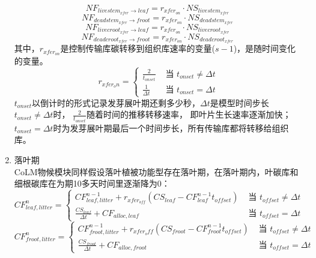 \begin{enumerate}
\begin{equation}
  NF_{livestem_{xfer}\rightarrow leaf}=r_{{xfer}_{on}}\cdot NS_{livestem_{xfer}}\ 
\end{equation}
\begin{equation}
  NF_{deadstem_{xfer}\rightarrow froot}=r_{{xfer}_{on}}\cdot NS_{deadstem_{xfer}}\ 
\end{equation}
\begin{equation}
  NF_{livecroot_{xfer}\rightarrow leaf}=r_{{xfer}_{on}}\cdot NS_{livecroot_{xfer}}\ 
\end{equation}
\begin{equation}
  NF_{deadcroot_{xfer}\rightarrow froot}=r_{{xfer}_{on}}\cdot NS_{deadcroot_{xfer}}\ 
\end{equation}
其中，$r_{{xfer}_{on}}$是控制传输库碳转移到组织库速率的变量($s-1$)，是随时间变化的变量。
\begin{equation}
r_{xfer_{o} n}=\left\{\begin{array}{ll}\frac{2}{t_{ {onset}}} &  \text{ 当 }  t_{ {onset}} \neq \Delta t \\ \frac{1}{\Delta t} &  \text{ 当 }  t_{onset}=\Delta t\end{array}\right.
\end{equation}
$t_{onset}$以倒计时的形式记录发芽展叶期还剩多少秒，$\Delta t$是模型时间步长$t_{onset}\neq\Delta t$时，
$\frac{2}{t_{onset}}$随着时间的推移转移速率，
即叶片生长速率逐渐加快；$t_{onset}=\Delta t$时为发芽展叶期最后一个时间步长，所有传输库都将转移给组织库。\\
\item 落叶期 \\
CoLM物候模块同样假设落叶植被功能型存在落叶期，在落叶期内，叶碳库和细根碳库在为期10多天时间里逐渐降为0：
\begin{equation}
CF_{ {leaf,litter }}^{n}=\left\{\begin{array}{ll}CF_{ {leaf,litter }}^{n-1}+r_{xfer_{off}}\left(CS_{ {leaf }}-CF_{ {leaf }}^{n-1} t_{ {offset }}\right) & \text{ 当 }  t_{ {offset }} \neq \Delta t \\ \frac{CS_{ {leaf }}}{\Delta t}+CF_{ {alloc,leaf }} &  \text{ 当 }  t_{offset}=\Delta t\end{array}\right.
\end{equation}
\begin{equation}
CF_{ {froot },  { litter }}^{n}=\left\{\begin{array}{ll}CF_{ {froot }, litter}^{n-1}+r_{xfer_{o} f f}\left(CS_{ {froot }}-CF_{ {froot }}^{n-1} t_{offset}\right) &  \text{ 当 }  t_{offset} \neq \Delta t \\ \frac{CS_{ {froot }}}{\Delta t}+CF_{ {alloc,froot }} &  \text{ 当 }  t_{offset}=\Delta t\end{array}\right.

\end{equation}
\end{enumerate}
